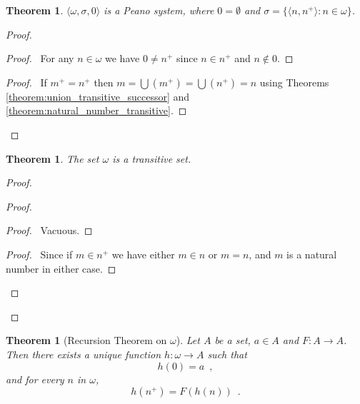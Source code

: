 \documentclass{article}
\let\qed\relax
\newtheorem{theorem}[axiom]{Theorem}
\theoremstyle{definition}
\newcommand{\ran}{\ensuremath{\operatorname{ran}}}
\begin{document}
    \begin{theorem}
        $\langle \omega, \sigma, 0 \rangle$ is a Peano system, where $0 = \emptyset$ and 
        $\sigma = \{ \langle n, n^+ \rangle : n \in \omega \}$.
    \end{theorem}

    \begin{proof}
        \pf
        \step{1}{$0 \notin \ran \sigma$}
        \begin{proof}
            \pf\ For any $n \in \omega$ we have $0 \neq n^+$ since $n \in n^+$
            and $n \notin 0$.
        \end{proof}
        \begin{proof}
            \pf\ If $m^+ = n^+$ then $m = \bigcup (m^+) = \bigcup (n^+) = n$ using Theorems
            \ref{theorem:union_transitive_successor} and \ref{theorem:natural_number_transitive}.
        \end{proof}
        \qed
    \end{proof}

    \begin{theorem}
        The set $\omega$ is a transitive set.
    \end{theorem}

    \begin{proof}
        \pf
        \begin{proof}
            \begin{proof}
                \pf\ Vacuous.
            \end{proof}
            \begin{proof}
                \pf\ Since if $m \in n^+$ we have either $m \in n$ or $m = n$, and $m$ is a natural number
                in either case.
            \end{proof}
        \end{proof}
        \qed
    \end{proof}

    \begin{theorem}[Recursion Theorem on $\omega$]
        Let $A$ be a set, $a \in A$ and $F : A \rightarrow A$. Then there exists a unique function
        $h : \omega \rightarrow A$ such that
        \[ h(0) = a \enspace , \]
        and for every $n$ in $\omega$,
        \[ h(n^+) = F(h(n)) \enspace . \]
    \end{theorem}
\end{document}
